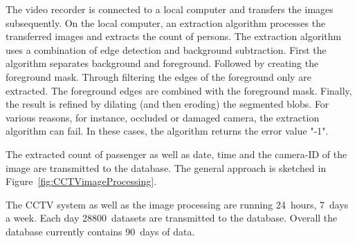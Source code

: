 The video recorder is connected to a local computer and transfers the images subsequently. 
On the local computer, an extraction algorithm processes the transferred images and extracts the count of persons.
The extraction algorithm uses a combination of edge detection and background subtraction. 
First the algorithm separates background and foreground. 
Followed by creating the foreground mask.
Through filtering the edges of the foreground only are extracted. 
The foreground edges are combined with the foreground mask. 
Finally, the result is refined by dilating (and then eroding) the segmented blobs.
For various reasons, for instance, occluded or damaged camera, the extraction algorithm can fail. 
In these cases, the algorithm returns the error value "-1".

The extracted count of passenger as well as date, time and the camera-ID of the image are transmitted to the database. 
The general approach is sketched in Figure~\ref{fig:CCTVimageProcessing}.


The CCTV system as well as the image processing are running 24~hours, 7~days a week. 
Each day 28800~datasets are transmitted to the database. 
Overall the database currently contains 90~days of data. 
